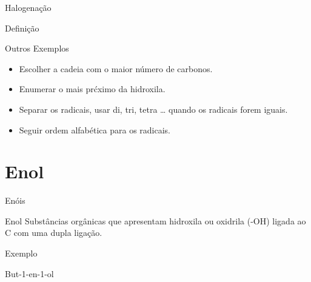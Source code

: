 \documentclass[presentation,professionalfonts,aspectratio=169]{beamer}
\newcommand{\af}{\hspace{2cm}}
\begin{document}
\begin{frame}[label={sec:orgc1e6b56}]{Halogenação}
\begin{frame}[label={sec:orgc944da7}]{Definição}
\begin{frame}[allowframebreaks]{Outros Exemplos}
\begin{myrule}{}
\begin{itemize}
\item Escolher a cadeia com o maior número de carbonos.
\item Enumerar o mais prćximo da hidroxila.
\item Separar os radicais, usar di, tri, tetra \ldots{} quando os radicais forem iguais.
\item Seguir ordem alfabética para os radicais.
\end{itemize}


\begin{center}
\end{center}



 \af
{}\af

\end{myrule}
\end{frame}





\section{Enol}
\label{sec:org38ce8eb}
\begin{frame}[label={sec:orgfb11b23}]{Enóis}
\begin{mybox}{Enol}
Substâncias  orgânicas  que  apresentam  hidroxila  ou oxidrila (-OH) ligada ao C com uma dupla ligação.


  \begin{center}
\chemmove{
	\node[inner sep=2pt,fill=red,fill opacity=0.2,fit=(OH1) (OH2)]{};
    }
    \end{center}

\end{mybox}
   \begin{myex}{Exemplo}
 \begin{center}  
{But-1-en-1-ol}
\end{center}\
%
\end{myex}
\end{frame}




\end{frame}
\end{frame}
\end{document}
